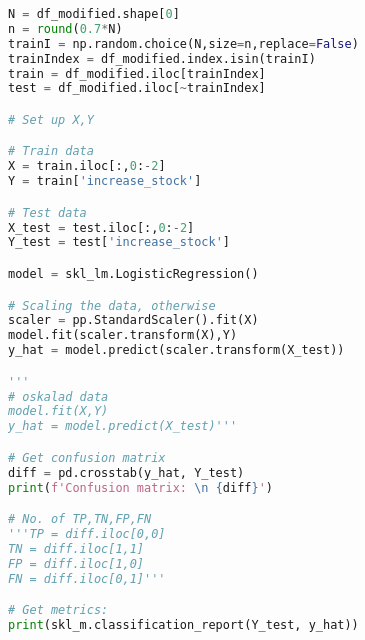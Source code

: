 \begin{lstlisting}[language = Python]
N = df_modified.shape[0]
n = round(0.7*N)
trainI = np.random.choice(N,size=n,replace=False)
trainIndex = df_modified.index.isin(trainI)
train = df_modified.iloc[trainIndex]
test = df_modified.iloc[~trainIndex]

# Set up X,Y

# Train data 
X = train.iloc[:,0:-2]
Y = train['increase_stock']

# Test data
X_test = test.iloc[:,0:-2]
Y_test = test['increase_stock']

model = skl_lm.LogisticRegression()

# Scaling the data, otherwise
scaler = pp.StandardScaler().fit(X)
model.fit(scaler.transform(X),Y)
y_hat = model.predict(scaler.transform(X_test))

'''
# oskalad data
model.fit(X,Y)
y_hat = model.predict(X_test)'''

# Get confusion matrix
diff = pd.crosstab(y_hat, Y_test)
print(f'Confusion matrix: \n {diff}')

# No. of TP,TN,FP,FN
'''TP = diff.iloc[0,0]
TN = diff.iloc[1,1]
FP = diff.iloc[1,0]
FN = diff.iloc[0,1]'''

# Get metrics:
print(skl_m.classification_report(Y_test, y_hat))
   
\end{lstlisting}



